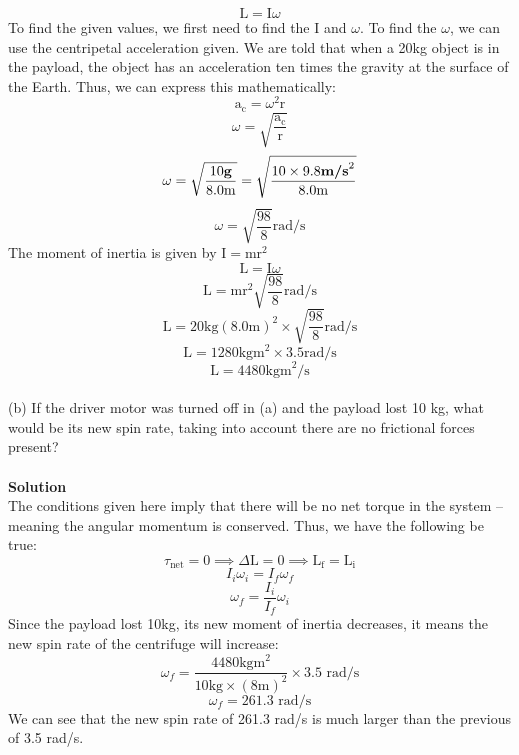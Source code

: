 \documentclass[9pt,addpoints]{exam}
\begin{document}
\begin{questions}
		$$\text{L}=\text{I}\omega$$
		To find the given values, we first need to find the I and $\omega$. To find the $\omega$, we can use the centripetal acceleration given. We are told that when a 20kg object is in the payload, the object has an acceleration ten times the gravity at the surface of the Earth. Thus, we can express this mathematically:
		$$\text{a}_\text{c}=\omega^2\text{r}$$
		$$\omega=\sqrt{\dfrac{\text{a}_\text{c}}{\text{r}}}$$	
		$$\omega=\sqrt{\dfrac{10\textbf{g}}{\text{8.0\text{m}}}}=\sqrt{\dfrac{10\times9.8\textbf{m/s}^2}{\text{8.0\text{m}}}}$$
		$$\omega=\sqrt{\dfrac{98}{8}}\text{rad/s}$$	
		The moment of inertia is given by $\text{I}=\text{mr}^2$
		$$\text{L}=\text{I}\omega$$
		$$\text{L}=\text{mr}^2\sqrt{\dfrac{98}{8}}\text{rad/s}$$
		$$\text{L}=20\text{kg}(8.0\text{m})^2\times\sqrt{\dfrac{98}{8}}\text{rad/s}$$
		$$\text{L}=1280\text{kgm}^2\times3.5\text{rad/s}$$
		$$\text{L}=4480\text{kgm}^2/\text{s}$$
		\\
		 (b) If the driver motor was turned off in (a) and the payload lost 10 kg, what would be its new spin rate, taking into account there are no frictional forces present? \\ \\
		\textbf{Solution} \\
		The conditions given here imply that there will be no net torque in the system -- meaning the angular momentum is conserved. Thus, we have the following be true:
		$$\tau_{\text{net}}=0\implies\varDelta\text{L}=0\implies\text{L}_\text{f}=\text{L}_\text{i}$$
		$$I_i\omega_i=I_f\omega_f$$
		$$\omega_f=\dfrac{I_i}{I_f}\omega_i$$
		Since the payload lost 10kg, its new moment of inertia decreases, it means the new spin rate of the centrifuge will increase:
		$$\omega_f=\dfrac{4480\text{kgm}^2}{10\text{kg}\times(8\text{m})^2}\times3.5\text{ rad/s}$$
		$$\omega_f=261.3\text{ rad/s}$$
		We can see that the new spin rate of 261.3 rad/s is much larger than the previous of 3.5 rad/s. 
	\end{questions}		
\end{document}
